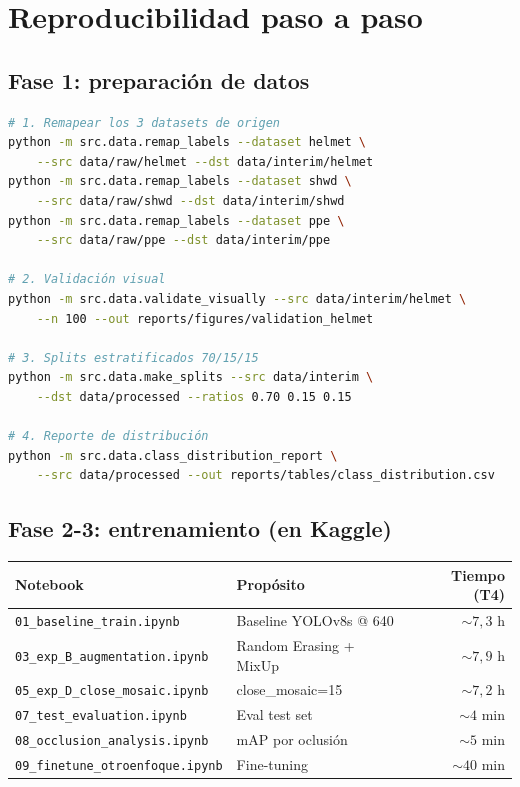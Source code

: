 \documentclass[11pt,a4paper]{article}
\begin{document}
\section{Reproducibilidad paso a paso}

\subsection{Fase 1: preparación de datos}

\begin{lstlisting}[language=bash, basicstyle=\ttfamily\scriptsize]
# 1. Remapear los 3 datasets de origen
python -m src.data.remap_labels --dataset helmet \
    --src data/raw/helmet --dst data/interim/helmet
python -m src.data.remap_labels --dataset shwd \
    --src data/raw/shwd --dst data/interim/shwd
python -m src.data.remap_labels --dataset ppe \
    --src data/raw/ppe --dst data/interim/ppe

# 2. Validación visual
python -m src.data.validate_visually --src data/interim/helmet \
    --n 100 --out reports/figures/validation_helmet

# 3. Splits estratificados 70/15/15
python -m src.data.make_splits --src data/interim \
    --dst data/processed --ratios 0.70 0.15 0.15

# 4. Reporte de distribución
python -m src.data.class_distribution_report \
    --src data/processed --out reports/tables/class_distribution.csv
\end{lstlisting}

\subsection{Fase 2-3: entrenamiento (en Kaggle)}

\begin{table}[H]
\centering
\begin{tabular}{l l r}
\toprule
\textbf{Notebook} & \textbf{Propósito} & \textbf{Tiempo (T4)} \\
\midrule
\texttt{01\_baseline\_train.ipynb} & Baseline YOLOv8s @ 640 & $\sim 7{,}3$ h \\
\texttt{03\_exp\_B\_augmentation.ipynb} & Random Erasing + MixUp & $\sim 7{,}9$ h \\
\texttt{05\_exp\_D\_close\_mosaic.ipynb} & close\_mosaic=15 & $\sim 7{,}2$ h \\
\texttt{07\_test\_evaluation.ipynb} & Eval test set & $\sim 4$ min \\
\texttt{08\_occlusion\_analysis.ipynb} & mAP por oclusión & $\sim 5$ min \\
\texttt{09\_finetune\_otroenfoque.ipynb} & Fine-tuning & $\sim 40$ min \\
\bottomrule
\end{tabular}
\end{table}
\end{document}
